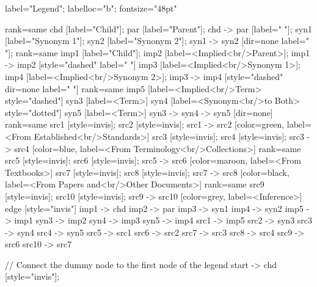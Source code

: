 \documentclass{article}
\begin{document}
{{    label="Legend";
    labelloc="b";
    fontsize="48pt"

    {
        rank=same
        chd [label="Child"];
        par [label="Parent"];
        chd -> par [label="                "];
        syn1 [label="Synonym 1"];
        syn2 [label="Synonym 2"];
        syn1 -> syn2 [dir=none label="                "];
    }
    {
        rank=same
        imp1 [label="Child"];
        imp2 [label=<Implied<br/>Parent>];
        imp1 -> imp2 [style="dashed" label="                "]
        imp3 [label=<Implied<br/>Synonym 1>];
        imp4 [label=<Implied<br/>Synonym 2>];
        imp3 -> imp4 [style="dashed" dir=none label="                "]
    }
    {
        rank=same
        imp5 [label=<Implied<br/>Term> style="dashed"]
        syn3 [label=<Term>]
        syn4 [label=<Synonym<br/>to Both> style="dotted"]
        syn5 [label=<Term>]
        syn3 -> syn4 -> syn5 [dir=none]
    }
{
rank=same
src1 [style=invis];
src2 [style=invis];
src1 -> src2 [color=green, label=<From Established<br/>Standards>]
src3 [style=invis];
src4 [style=invis];
src3 -> src4 [color=blue, label=<From Terminology<br/>Collections>]
}
{
rank=same
src5 [style=invis];
src6 [style=invis];
src5 -> src6 [color=maroon, label=<From Textbooks>]
src7 [style=invis];
src8 [style=invis];
src7 -> src8 [color=black, label=<From Papers and<br/>Other Documents>]
}
{
rank=same
src9 [style=invis];
src10 [style=invis];
src9 -> src10 [color=grey, label=<Inference>]
}
edge [style="invis"]
imp1 -> chd
imp2 -> par
imp3 -> syn1
imp4 -> syn2
imp5 -> imp1
syn3 -> imp2
syn4 -> imp3
syn5 -> imp4
src1 -> imp5
src2 -> syn3
src3 -> syn4
src4 -> syn5
src5 -> src1
src6 -> src2
src7 -> src3
src8 -> src4
src9 -> src6
src10 -> src7
}

// Connect the dummy node to the first node of the legend
start -> chd [style="invis"];
}
\end{document}
